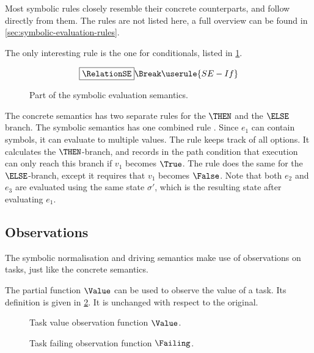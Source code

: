 Most symbolic rules closely resemble their concrete counterparts, and follow directly from them.
The rules are not listed here, a full overview can be found in \cref{sec:symbolic-evaluation-rules}.

The only interesting rule is the one for conditionals, listed in \cref{fig:eval}.
\begin{figure}[ht]
  \small
  \begin{gather*}
    \boxed{\RelationSE} \Break
    \userule{SE-If}
  \end{gather*}
  \caption{Part of the symbolic evaluation semantics.}
  \label{fig:eval}
\end{figure}
The concrete semantics has two separate rules for the $\THEN$ and the $\ELSE$ branch.
The symbolic semantics has one combined rule .
Since $e_1$ can contain symbols, it can evaluate to multiple values.
The rule keeps track of all options.
It calculates the $\THEN$-branch, and records in the path condition that execution can only reach this branch if $v_1$ becomes $\True$.
The rule does the same for the $\ELSE$-branch, except it requires that $v_1$ becomes $\False$.
Note that both $e_2$ and $e_3$ are evaluated using the same state $\sigma'$,
which is the resulting state after evaluating $e_1$.



\subsection{Observations}
\label{subsec:observations}

The symbolic normalisation and driving semantics make use of observations on tasks, just like the concrete semantics.

The partial function $\Value$ can be used to observe the value of a task.
Its definition is given in \cref{fig:value}.
It is unchanged with respect to the original.

\begin{figure}[ht]
  \small
  \begin{center}
  \end{center}
  \caption{Task value observation function $\Value$.}
  \label{fig:value}
\end{figure}

\begin{figure}[ht]
  \small
  \begin{center}
  \end{center}
  \caption{Task failing observation function $\Failing$.}
  \label{fig:failing}
\end{figure}

